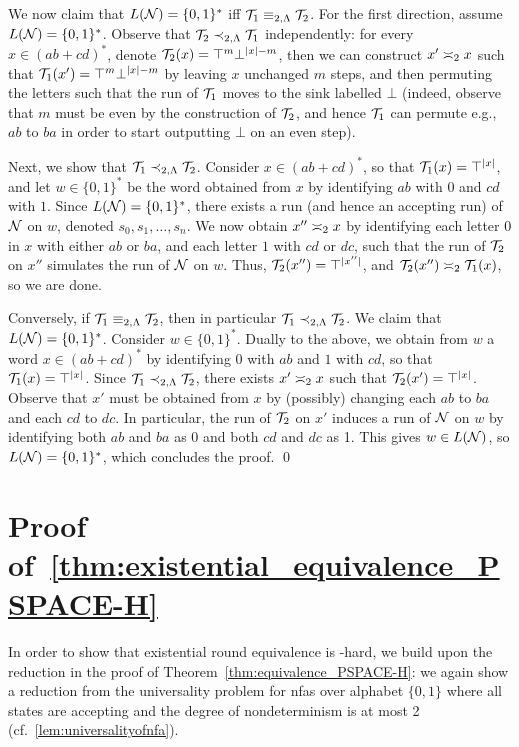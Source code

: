 We now claim that $L(\cN)=\{0,1\}^*$ iff $\cT_1\equiv_{2,\fL}\cT_2$.
For the first direction, assume $L(\cN)=\{0,1\}^*$. Observe that $\cT_2\prec_{2,\fL}\cT_1$ independently: for every $x\in (ab+cd)^*$, denote $\cT_2(x)=\top^{m}\bot^{|x|-m}$, then we can construct $x'\req[2]x$ such that $\cT_1(x')=\top^{m}\bot^{|x|-m}$ by leaving $x$ unchanged $m$ steps, and then permuting the letters such that the run of $\cT_1$ moves to the sink labelled $\bot$ (indeed, observe that $m$ must be even by the construction of $\cT_2$, and hence $\cT_1$ can permute e.g., $ab$ to $ba$ in order to start outputting $\bot$ on an even step).

Next, we show that $\cT_1\prec_{2,\fL}\cT_2$. Consider $x\in (ab+cd)^*$, so that $\cT_1(x)=\top^{|x|}$, and let $w\in \{0,1\}^*$ be the word obtained from $x$ by identifying $ab$ with $0$ and $cd$ with $1$. Since $L(\cN)=\{0,1\}^*$, there exists a run (and hence an accepting run) of $\cN$ on $w$, denoted $s_0,s_1,\ldots,s_n$. We now obtain $x''\req[2]x$ by identifying each letter $0$ in $x$ with either $ab$ or $ba$, and each letter $1$ with $cd$ or $dc$, such that the run of $\cT_2$ on $x''$ simulates the run of $\cN$ on $w$. Thus, $\cT_2(x'')=\top^{|x''|}$, and $\cT_2(x'')\req[2]\cT_1(x)$, so we are done.

Conversely, if $\cT_1\equiv_{2,\fL}\cT_2$, then in particular $\cT_1\prec_{2,\fL}\cT_2$. We claim that $L(\cN)=\{0,1\}^*$. Consider $w\in \{0,1\}^*$. Dually to the above, we obtain from $w$ a word $x\in (ab+cd)^*$ by identifying $0$ with $ab$ and $1$ with $cd$, so that $\cT_1(x)=\top^{|x|}$. 
Since $\cT_1\prec_{2,\fL}\cT_2$, there exists $x'\req[2]x$ such that $\cT_2(x')=\top^{|x|}$. Observe that $x'$ must be obtained from $x$ by (possibly) changing each $ab$ to $ba$ and each $cd$ to $dc$. In particular, the run of $\cT_2$ on $x'$ induces a run of $\cN$ on $w$ by identifying both $ab$ and $ba$ as 0 and both $cd$ and $dc$ as 1. This gives $w\in L(\cN)$, so $L(\cN)=\{0,1\}^*$, which concludes the proof. \qed

\section{Proof of~\cref{thm:existential_equivalence_PSPACE-H}}
\label{apx:proof_existential_PSPACE-H}

In order to show that existential round equivalence is \PSPACE-hard, we build upon the reduction in the proof of Theorem~\ref{thm:equivalence_PSPACE-H}: we again show a reduction from the universality problem for \glspl{nfa} over alphabet $\{0,1\}$ where all states are accepting and the degree of nondeterminism is at most 2 (cf.~\cref{lem:universalityofnfa}).

